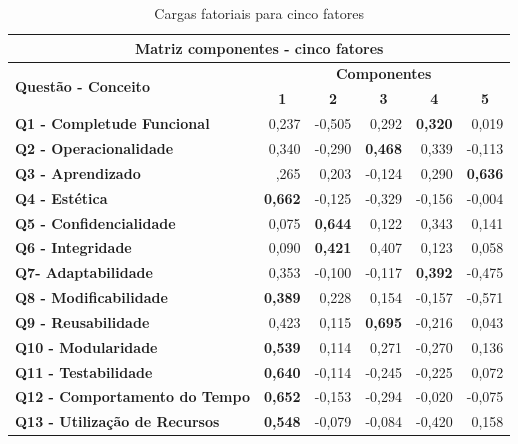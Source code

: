 \begin{apendicesenv}
 \begin{longtable}[htbp]{rrrrrr}
    \caption{Cargas fatoriais para cinco fatores}
    \label{5-fatores}
    \\\hline
    \multicolumn{6}{c}{\textbf{Matriz componentes - cinco fatores}} \\
    \hline
    \multicolumn{1}{l}{\multirow{2}[2]{*}{\textbf{Questão - Conceito}}} & \multicolumn{5}{c}{\textbf{Componentes}} \\
    \multicolumn{1}{l}{} & \multicolumn{1}{c}{\textbf{1}} & \multicolumn{1}{c}{\textbf{2}} & \multicolumn{1}{c}{\textbf{3}} & \multicolumn{1}{c}{\textbf{4}} & \multicolumn{1}{c}{\textbf{5}} \\
    \multicolumn{1}{l}{\textbf{Q1 - Completude Funcional}} & 0,237  & -0,505 & 0,292  & \textbf{0,320} & 0,019 \\
    \multicolumn{1}{l}{\textbf{Q2 - Operacionalidade}} & 0,340  & -0,290 & \textbf{0,468} & 0,339  & -0,113 \\
    \multicolumn{1}{l}{\textbf{Q3 - Aprendizado}} & ,265  & 0,203  & -0,124 & 0,290  & \textbf{0,636} \\
    \multicolumn{1}{l}{\textbf{Q4 - Estética}} & \textbf{0,662} & -0,125 & -0,329 & -0,156 & -0,004 \\
    \multicolumn{1}{l}{\textbf{Q5 - Confidencialidade}} & 0,075  & \textbf{0,644} & 0,122  & 0,343  & 0,141 \\
    \multicolumn{1}{l}{\textbf{Q6 - Integridade}} & 0,090  & \textbf{0,421} & 0,407  & 0,123  & 0,058 \\
    \multicolumn{1}{l}{\textbf{Q7- Adaptabilidade}} & 0,353  & -0,100 & -0,117 & \textbf{0,392} & -0,475 \\
    \multicolumn{1}{l}{\textbf{Q8 - Modificabilidade}} & \textbf{0,389} & 0,228  & 0,154  & -0,157 & -0,571 \\
    \multicolumn{1}{l}{\textbf{Q9 - Reusabilidade}} & 0,423  & 0,115  & \textbf{0,695} & -0,216 & 0,043 \\
    \multicolumn{1}{l}{\textbf{Q10 - Modularidade}} & \textbf{0,539} & 0,114  & 0,271  & -0,270 & 0,136 \\
    \multicolumn{1}{l}{\textbf{Q11 - Testabilidade}} & \textbf{0,640} & -0,114 & -0,245 & -0,225 & 0,072 \\
    \multicolumn{1}{l}{\textbf{Q12 - Comportamento do Tempo}} & \textbf{0,652} & -0,153 & -0,294 & -0,020 & -0,075 \\
    \multicolumn{1}{l}{\textbf{Q13 - Utilização de Recursos}} & \textbf{0,548} & -0,079 & -0,084 & -0,420 & 0,158 \\

\end{longtable}
\end{apendicesenv}
